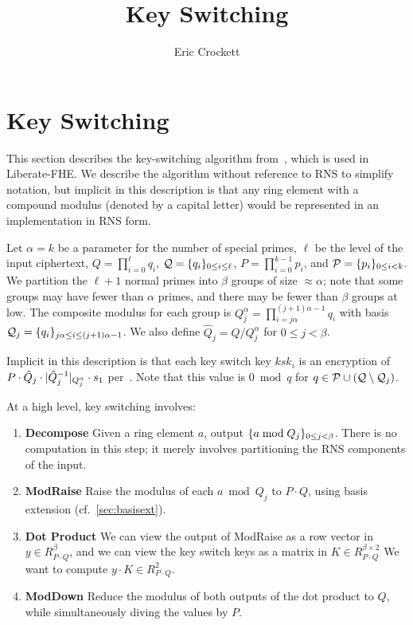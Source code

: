 \documentclass[../keyswitching.tex]{subfiles}
\title{Key Switching}
\author{Eric Crockett}
\begin{document}
	\ifcompileasbook
	\else
	\maketitle
	\listoffixmes
	\fi

\section{Key Switching}
\label{sec:ks}
This section describes the key-switching algorithm from~\cite{cryptoeprint:2019/688}, which is used in Liberate-FHE.
We describe the algorithm without reference to RNS to simplify notation, but implicit in this description is that any ring element with a compound modulus (denoted by a capital letter) would be represented in an implementation in RNS form.

Let $\alpha=k$ be a parameter for the number of special primes, $\ell$ be the level of the input ciphertext, $Q=\prod_{i=0}^{\ell}q_i$, $\mathcal{Q}=\{q_i\}_{0\le i \le \ell}$, $P=\prod_{i=0}^{k-1}p_i$, and $\mathcal{P}=\{p_i\}_{0\le i < k}$. We partition the $\ell+1$ normal primes into $\beta$ groups of size $\approx \alpha$; note that some groups may have fewer than $\alpha$ primes, and there may be fewer than $\beta$ groups at low. The composite modulus for each group is $Q_j^\alpha=\prod_{i=j\alpha}^{(j+1)\alpha-1}q_i$ with basis $\mathcal{Q}_j=\{q_i\}_{j\alpha\le i\le (j+1)\alpha-1}$. We also define $\hat{Q}_j=Q/ Q_j^\alpha$ for $0\le j<\beta$.

Implicit in this description is that each key switch key $ksk_i$ is an encryption of $P\cdot \hat{Q}_j\cdot \lvert\hat{Q}_j^{-1}\rvert_{Q_j^\alpha}\cdot s_1$ per~\cite{cryptoeprint:2020/1203}. Note that this value is $0\bmod q$ for $q\in \mathcal{P}\cup(\mathcal{Q}\setminus \mathcal{Q}_j)$.

At a high level, key switching involves:
\begin{enumerate}
	\item \textbf{Decompose} Given a ring element $a$, output $\{a\bmod Q_j\}_{0\le j< \beta}$. There is no computation in this step; it merely involves partitioning the RNS components of the input.
	\item \textbf{ModRaise} Raise the modulus of each $a\bmod Q_j$ to $P\cdot Q$, using basis extension (cf.~\cref{sec:basisext}).
	\item \textbf{Dot Product} We can view the output of \textrm{ModRaise} as a row vector in $y\in R_{P\cdot Q}^\beta$, and we can view the key switch keys as a matrix in $K\in R_{P\cdot Q}^{\beta\times 2}$ We want to compute $y\cdot K\in R^2_{P\cdot Q}$.
	\item \textbf{ModDown} Reduce the modulus of both outputs of the dot product to $Q$, while simultaneously diving the values by $P$.
\end{enumerate}
\end{document}
